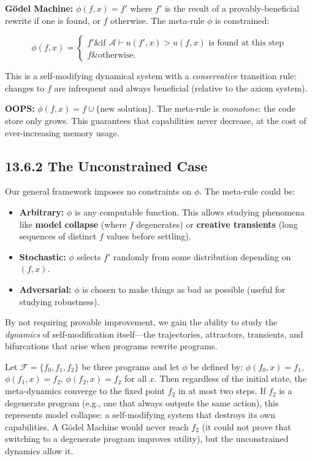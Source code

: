 \textbf{Gödel Machine:} $\phi(f, x) = f'$ where $f'$ is the result of a provably-beneficial rewrite if one is found, or $f$ otherwise. The meta-rule $\phi$ is constrained:

\[\phi(f, x) = \begin{cases} f' \& \text{if } \mathcal{A} \vdash u(f', x) > u(f, x) \text{ is found at this step} \\ f \& \text{otherwise.} \end{cases}\]

This is a self-modifying dynamical system with a \textit{conservative} transition rule: changes to $f$ are infrequent and always beneficial (relative to the axiom system).

\textbf{OOPS:} $\phi(f, x) = f \cup \{ \text{new solution}\} $. The meta-rule is \textit{monotone}: the code store only grows. This guarantees that capabilities never decrease, at the cost of ever-increasing memory usage.

\subsection{13.6.2 The Unconstrained Case}

Our general framework imposes no constraints on $\phi$. The meta-rule could be:

\begin{itemize}
\item \textbf{Arbitrary:} $\phi$ is any computable function. This allows studying phenomena like \textbf{model collapse} (where $f$ degenerates) or \textbf{creative transients} (long sequences of distinct $f$ values before settling).
\item \textbf{Stochastic:} $\phi$ selects $f'$ randomly from some distribution depending on $(f, x)$.
\item \textbf{Adversarial:} $\phi$ is chosen to make things as bad as possible (useful for studying robustness).
\end{itemize}

By not requiring provable improvement, we gain the ability to study the \textit{dynamics} of self-modification itself---the trajectories, attractors, transients, and bifurcations that arise when programs rewrite programs.

\begin{example}
Let $\mathcal{F} = \{ f_0, f_1, f_2\} $ be three programs and let $\phi$ be defined by: $\phi(f_0, x) = f_1$, $\phi(f_1, x) = f_2$, $\phi(f_2, x) = f_2$ for all $x$. Then regardless of the initial state, the meta-dynamics converge to the fixed point $f_2$ in at most two steps. If $f_2$ is a degenerate program (e.g., one that always outputs the same action), this represents model collapse: a self-modifying system that destroys its own capabilities. A Gödel Machine would never reach $f_2$ (it could not prove that switching to a degenerate program improves utility), but the unconstrained dynamics allow it.
\end{example}


